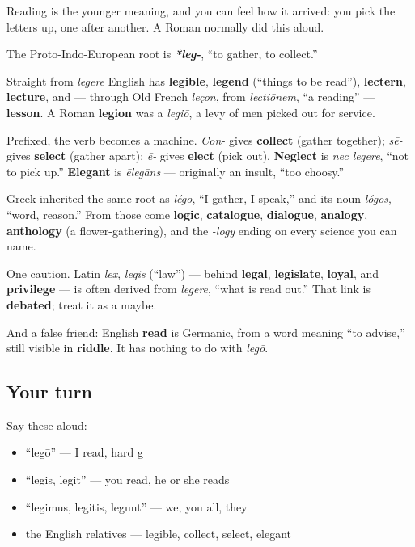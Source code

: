 Reading is the younger meaning, and you can feel how it arrived: you pick the letters up, one after another. A Roman normally did this aloud.

\begin{cousinweb}
The Proto-Indo-European root is \emph{\textbf{*leg-}}, \textquotedblleft{}to gather, to collect.\textquotedblright{}

Straight from \emph{legere} English has \textbf{legible}, \textbf{legend} (\textquotedblleft{}things to be read\textquotedblright{}), \textbf{lectern}, \textbf{lecture}, and — through Old French \emph{leçon}, from \emph{lectiōnem}, \textquotedblleft{}a reading\textquotedblright{} — \textbf{lesson}. A Roman \textbf{legion} was a \emph{legiō}, a levy of men picked out for service.

Prefixed, the verb becomes a machine. \emph{Con-} gives \textbf{collect} (gather together); \emph{sē-} gives \textbf{select} (gather apart); \emph{ē-} gives \textbf{elect} (pick out). \textbf{Neglect} is \emph{nec legere}, \textquotedblleft{}not to pick up.\textquotedblright{} \textbf{Elegant} is \emph{ēlegāns} — originally an insult, \textquotedblleft{}too choosy.\textquotedblright{}

Greek inherited the same root as \emph{légō}, \textquotedblleft{}I gather, I speak,\textquotedblright{} and its noun \emph{lógos}, \textquotedblleft{}word, reason.\textquotedblright{} From those come \textbf{logic}, \textbf{catalogue}, \textbf{dialogue}, \textbf{analogy}, \textbf{anthology} (a flower-gathering), and the \emph{-logy} ending on every science you can name.

One caution. Latin \emph{lēx}, \emph{lēgis} (\textquotedblleft{}law\textquotedblright{}) — behind \textbf{legal}, \textbf{legislate}, \textbf{loyal}, and \textbf{privilege} — is often derived from \emph{legere}, \textquotedblleft{}what is read out.\textquotedblright{} That link is \textbf{debated}; treat it as a maybe.

And a false friend: English \textbf{read} is Germanic, from a word meaning \textquotedblleft{}to advise,\textquotedblright{} still visible in \textbf{riddle}. It has nothing to do with \emph{legō}.
\end{cousinweb}

\subsection*{Your turn}
Say these aloud:

\begin{itemize}
\raggedright
  \item \textquotedblleft{}legō\textquotedblright{} — I read, hard g
  \item \textquotedblleft{}legis, legit\textquotedblright{} — you read, he or she reads
  \item \textquotedblleft{}legimus, legitis, legunt\textquotedblright{} — we, you all, they
  \item the English relatives — legible, collect, select, elegant
\end{itemize}

